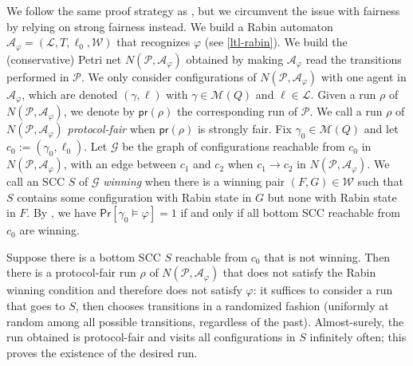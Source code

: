 \documentclass[10pt,a4paper]{article}
\newcommand{\deff}{:=}
\newcommand{\multisetsof}[1]{\mathcal{M}(#1)}
\newcommand{\prot}{\mathcal{P}}
\newcommand{\config}{\gamma}
\newcommand{\step}[1]{\xrightarrow{#1}}
\newcommand{\run}{\rho}
\newcommand*{\states}{Q}
\newcommand*{\buchiaut}{\mathcal{A}}
\newcommand*{\ltlaut}[1]{\buchiaut_{#1}}
\newcommand{\bstates}{\mathcal{L}}
\newcommand{\btransitions}{T}
\newcommand*{\abuchistate}{\ell}
\newcommand*{\bstate}{\abuchistate}
\newcommand*{\binitstate}{\bstate_0}
\newcommand*{\bwinning}{\mathcal{W}}
\newcommand{\pr}[2]{\mathsf{Pr}[#1 \models #2]}
\newcommand{\prodnet}[2]{N(#1, \ltlaut{#2})}
\newcommand{\protproj}[1]{\mathsf{pr}(#1)}
\begin{document}
\begin{appendixproof}
	We follow the same proof strategy as \cite[Proposition 7]{EGLM16}, but we circumvent the issue with fairness by relying on strong fairness instead.
	We build a Rabin automaton \(\ltlaut{\varphi} = (\bstates, \btransitions, \binitstate, \bwinning)\) that recognizes \(\varphi\) (see \cref{ltl-rabin}).
	We build the (conservative) Petri net \(\prodnet{\prot}{\varphi}\) obtained by making \(\ltlaut{\varphi}\) read the transitions performed in \(\prot\).
	We only consider configurations of \(\prodnet{\prot}{\varphi}\) with one agent in \(\ltlaut{\varphi}\), which are denoted \((\config, \bstate)\) with \(\config \in \multisetsof{\states}\) and \(\bstate \in \bstates\).
	Given a run \(\run\) of \(\prodnet{\prot}{\varphi}\), we denote by \(\protproj{\run}\) the corresponding run of \(\prot\).
	We call a run \(\run\) of \(\prodnet{\prot}{\varphi}\) \emph{protocol-fair} when \(\protproj{\run}\) is strongly fair.
	Fix \(\config_0 \in \multisetsof{\states}\) and let \(c_0 \deff (\config_0, \binitstate)\).
	Let \(\mathcal{G}\) be the graph of configurations reachable from \(c_0\) in \(\prodnet{\prot}{\varphi}\), with an edge between \(c_1\) and \(c_2\) when \(c_1 \step{} c_2\) in \(\prodnet{\prot}{\varphi}\).
	We call an SCC \(S\) of \(\mathcal{G}\) \emph{winning} when there is a winning pair \((F,G) \in \bwinning\) such that \(S\) contains some configuration with Rabin state in \(G\) but none with Rabin state in \(F\).
	By \cite[Proposition 6]{EGLM16}, we have \(\pr{\config_0}{\varphi}= 1\) if and only if all bottom SCC reachable from \(c_0\) are winning.

	Suppose there is a bottom SCC \(S\) reachable from \(c_0\) that is not winning.
	Then there is a protocol-fair run \(\run\) of \(\prodnet{\prot}{\varphi}\) that does not satisfy the Rabin winning condition and therefore does not satisfy \(\varphi\): it suffices to consider a run that goes to \(S\), then chooses transitions in a randomized fashion (uniformly at random among all possible transitions, regardless of the past).
	Almost-surely, the run obtained is protocol-fair and visits all configurations in \(S\) infinitely often; this proves the existence of the desired run.


\end{appendixproof}
\end{document}
